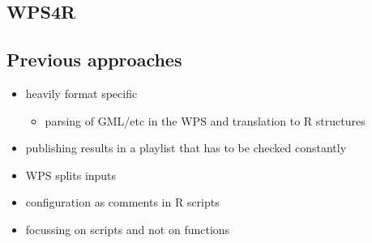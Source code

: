 	\subsection{WPS4R}
	\subsection{Previous approaches}
	\begin{itemize}
		\item heavily format specific
		\begin{itemize}
			\item parsing of GML/etc in the WPS and translation to R structures
		\end{itemize}
		\item publishing results in a playlist that has to be checked constantly
		\item WPS splits inputs
		\item configuration as comments in R scripts
		\item focussing on scripts and not on functions
	\end{itemize}
